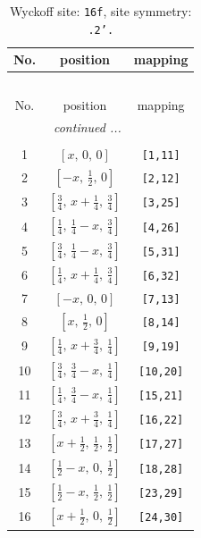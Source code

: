 \documentclass[fleqn,8pt]{jsarticle}
\begin{document}
\begin{longtable}{ccc}
\caption{Wyckoff site: {\tt 16f}, site symmetry: {\tt .2'.}}
 \\
 \hline \hline
No. & position & mapping \\ \hline \endfirsthead

\multicolumn{2}{l}{\tablename\ \thetable{}} \\
 \hline \hline
No. & position & mapping \\ \hline \endhead

 \hline \hline
\multicolumn{2}{r}{\footnotesize\it continued ...} \\ \endfoot

 \hline \hline
\multicolumn{2}{r}{} \\ \endlastfoot

1 & $\left[ x,\, 0,\, 0 \right]$ & {\tt [1,11]} \\ \hline
2 & $\left[ - x,\, \frac{1}{2},\, 0 \right]$ & {\tt [2,12]} \\ \hline
3 & $\left[ \frac{3}{4},\, x + \frac{1}{4},\, \frac{3}{4} \right]$ & {\tt [3,25]} \\ \hline
4 & $\left[ \frac{1}{4},\, \frac{1}{4} - x,\, \frac{3}{4} \right]$ & {\tt [4,26]} \\ \hline
5 & $\left[ \frac{3}{4},\, \frac{1}{4} - x,\, \frac{3}{4} \right]$ & {\tt [5,31]} \\ \hline
6 & $\left[ \frac{1}{4},\, x + \frac{1}{4},\, \frac{3}{4} \right]$ & {\tt [6,32]} \\ \hline
7 & $\left[ - x,\, 0,\, 0 \right]$ & {\tt [7,13]} \\ \hline
8 & $\left[ x,\, \frac{1}{2},\, 0 \right]$ & {\tt [8,14]} \\ \hline
9 & $\left[ \frac{1}{4},\, x + \frac{3}{4},\, \frac{1}{4} \right]$ & {\tt [9,19]} \\ \hline
10 & $\left[ \frac{3}{4},\, \frac{3}{4} - x,\, \frac{1}{4} \right]$ & {\tt [10,20]} \\ \hline
11 & $\left[ \frac{1}{4},\, \frac{3}{4} - x,\, \frac{1}{4} \right]$ & {\tt [15,21]} \\ \hline
12 & $\left[ \frac{3}{4},\, x + \frac{3}{4},\, \frac{1}{4} \right]$ & {\tt [16,22]} \\ \hline
13 & $\left[ x + \frac{1}{2},\, \frac{1}{2},\, \frac{1}{2} \right]$ & {\tt [17,27]} \\ \hline
14 & $\left[ \frac{1}{2} - x,\, 0,\, \frac{1}{2} \right]$ & {\tt [18,28]} \\ \hline
15 & $\left[ \frac{1}{2} - x,\, \frac{1}{2},\, \frac{1}{2} \right]$ & {\tt [23,29]} \\ \hline
16 & $\left[ x + \frac{1}{2},\, 0,\, \frac{1}{2} \right]$ & {\tt [24,30]} \\
\end{longtable}
\end{document}
